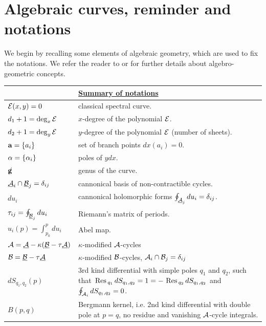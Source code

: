 \section{Algebraic curves, reminder and notations}


We begin by recalling some elements of algebraic geometry, which are used to fix the notations.
We refer the reader to
\cite{Farkas} or \cite{Fay} for further details about algebro-geometric concepts.

\bigskip

\noindent
\begin{tabular}{|l@{ $\,\,\longrightarrow\,\,$ }p{260pt}|}
\hline
&\underline{\bf Summary of notations} \\
\hline
${\cal E}(x,y)=0$ & classical spectral curve. \\
$d_1+1= \deg_{x} {\cal E}$  & $x$-degree of the polynomial ${\cal E}$. \\
$d_2+1 = \deg_{y} {\cal E}$  & $y$-degree of the polynomial ${\cal E}$ (number of sheets). \\
${\mathbf{a}}=\{a_i\} $ & set of branch points $dx(a_i)=0$. \\
${\mathbf{\alpha}}=\{\alpha_i\} $ & poles of $ydx$. \\
${\mathbf g \!\!\! /\;\;}$ & genus  of the curve. \\
$\underline{{\cal A}}_i \cap \underline{{\cal B}}_j =\delta_{ij}$ & cannonical basis of non-contractible cycles. \\
$du_i$  & cannonical holomorphic forms $\oint_{\underline{{\cal A}}_j} du_i = \delta_{ij}$. \\
$\tau_{ij} = \oint_{\underline{{\cal B}}_j} du_i$ & Riemann's matrix of periods. \\
$u_i(p) = \int_{p_0}^p du_i$ & Abel map. \\
${\cal A}=\underline{{\cal A}} - \kappa (\underline{{\cal B}}-\tau\underline{{\cal A}})$ & $\kappa$-modified ${\cal A}$-cycles \\
${\cal B}=\underline{{\cal B}}-\tau\underline{{\cal A}}$ & $\kappa$-modified ${\cal B}$-cycles, ${\cal A}_i \cap {\cal B}_j =\delta_{ij}$ \\
$dS_{q_1,q_2}(p)$ & 3rd kind differential with simple poles $q_1$ and $q_2$, such that $\mathop{\,\rm Res\,}_{q_1} dS_{q_1,q_2} = 1=- \mathop{\,\rm Res\,}_{q_2} dS_{q_1,q_2}$ and $\oint_{{\cal A}_i} dS_{q_1,q_2} =0$. \\
$B(p,q)$ & Bergmann kernel, i.e. 2nd kind differential with double pole at $p=q$, no residue and vanishing ${\cal A}$-cycle integrals. \\

\end{tabular}
